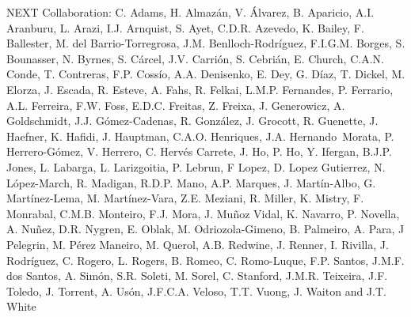 NEXT Collaboration: C. Adams, H. Almaz\'an, V. \'Alvarez, B. Aparicio, A.I. Aranburu, L. Arazi, I.J. Arnquist, S. Ayet, C.D.R. Azevedo, K. Bailey, F. Ballester, M. del Barrio-Torregrosa, J.M. Benlloch-Rodr\'{i}guez, F.I.G.M. Borges, S. Bounasser, N. Byrnes, S. C\'arcel, J.V. Carri\'on, S. Cebri\'an, E. Church, C.A.N. Conde, T. Contreras, F.P. Coss\'io, A.A. Denisenko, E. Dey, G. D\'iaz, T. Dickel, M. Elorza, J. Escada, R. Esteve, A. Fahs, R. Felkai, L.M.P. Fernandes, P. Ferrario, A.L. Ferreira, F.W. Foss, E.D.C. Freitas, Z. Freixa, J. Generowicz, A. Goldschmidt, J.J. G\'omez-Cadenas, R. Gonz\'alez, J. Grocott, R. Guenette, J. Haefner, K. Hafidi, J. Hauptman, C.A.O. Henriques, J.A. Hernando~Morata, P. Herrero-G\'omez, V. Herrero, C. Herv\'es Carrete, J. Ho, P. Ho, Y. Ifergan, B.J.P. Jones, L. Labarga, L. Larizgoitia, P. Lebrun, F Lopez, D. Lopez Gutierrez, N. L\'opez-March, R. Madigan, R.D.P. Mano, A.P. Marques, J. Mart\'in-Albo, G. Mart\'inez-Lema, M. Mart\'inez-Vara, Z.E. Meziani, R. Miller, K. Mistry, F. Monrabal, C.M.B. Monteiro, F.J. Mora, J. Mu\~noz Vidal, K. Navarro, P. Novella, A. Nu\~{n}ez, D.R. Nygren, E. Oblak, M. Odriozola-Gimeno, B. Palmeiro, A. Para, J Pelegrin, M. P\'erez Maneiro, M. Querol, A.B. Redwine, J. Renner, I. Rivilla, J. Rodr\'iguez, C. Rogero, L. Rogers, B. Romeo, C. Romo-Luque, F.P. Santos, J.M.F. dos Santos, A. Sim\'on, S.R. Soleti, M. Sorel, C. Stanford, J.M.R. Teixeira, J.F. Toledo, J. Torrent, A. Us\'on, J.F.C.A. Veloso, T.T. Vuong, J. Waiton and J.T. White